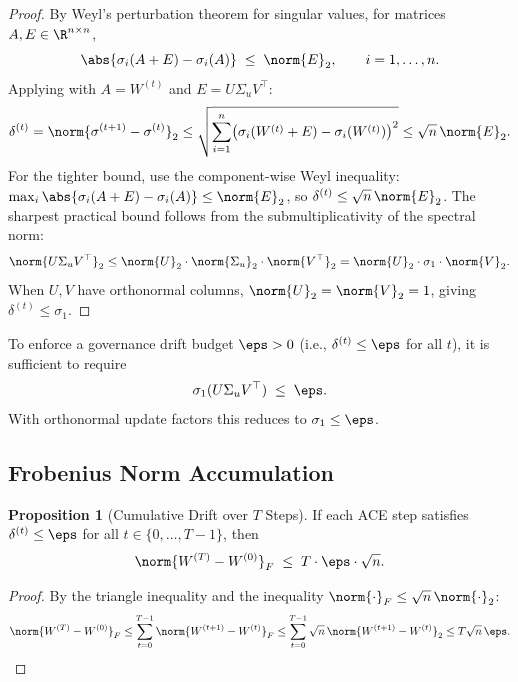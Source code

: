 \documentclass[12pt,letterpaper]{article}
\theoremstyle{definition}
\newtheorem{proposition}{Proposition}[section]
\theoremstyle{remark}
\begin{document}
\begin{proof}
  By Weyl's perturbation theorem for singular values, for matrices
  \(A, E \in \R^{n \times n}\),
  \[
    \abs{\sigma_i(A + E) - \sigma_i(A)} \;\le\; \norm{E}_2,
    \qquad i = 1, \ldots, n.
  \]
  Applying with \(A = W^{(t)}\) and \(E = U\Sigma_u V^\top\):
  \[
    \delta^{(t)} = \norm{\sigma^{(t+1)} - \sigma^{(t)}}_2
    \le \sqrt{\sum_{i=1}^n \bigl(\sigma_i(W^{(t)}+E) - \sigma_i(W^{(t)})\bigr)^2}
    \le \sqrt{n}\,\norm{E}_2.
  \]
  For the tighter bound, use the component-wise Weyl inequality:
  \(\max_i\abs{\sigma_i(A+E) - \sigma_i(A)} \le \norm{E}_2\), so
  \(\delta^{(t)} \le \sqrt{n}\,\norm{E}_2\).
  The sharpest practical bound follows from the submultiplicativity of the
  spectral norm:
  \[
    \norm{U\Sigma_u V^\top}_2
    \le \norm{U}_2 \cdot \norm{\Sigma_u}_2 \cdot \norm{V^\top}_2
    = \norm{U}_2 \cdot \sigma_1 \cdot \norm{V}_2.
  \]
  When \(U,V\) have orthonormal columns, \(\norm{U}_2 = \norm{V}_2 = 1\),
  giving \(\delta^{(t)} \le \sigma_1\).
\end{proof}

\begin{corollary}
  \label{cor:drift-budget}
  To enforce a governance drift budget \(\eps > 0\) (i.e.,
  \(\delta^{(t)} \le \eps\) for all \(t\)), it is sufficient to require
  \[
    \sigma_1(U \Sigma_u V^\top) \;\le\; \eps.
  \]
  With orthonormal update factors this reduces to \(\sigma_1 \le \eps\).
\end{corollary}

\subsection{Frobenius Norm Accumulation}
\label{ssec:frob}

\begin{proposition}[Cumulative Drift over \(T\) Steps]
  \label{prop:cumul-drift}
  If each ACE step satisfies \(\delta^{(t)} \le \eps\) for all
  \(t \in \{0, \ldots, T-1\}\), then
  \[
    \norm{W^{(T)} - W^{(0)}}_F \;\le\; T \cdot \eps \cdot \sqrt{n}.
  \]
\end{proposition}

\begin{proof}
  By the triangle inequality and the inequality
  \(\norm{\cdot}_F \le \sqrt{n}\,\norm{\cdot}_2\):
  \[
    \norm{W^{(T)} - W^{(0)}}_F
    \le \sum_{t=0}^{T-1} \norm{W^{(t+1)} - W^{(t)}}_F
    \le \sum_{t=0}^{T-1} \sqrt{n}\,\norm{W^{(t+1)}-W^{(t)}}_2
    \le T\sqrt{n}\,\eps.
  \]
\end{proof}
\end{document}
